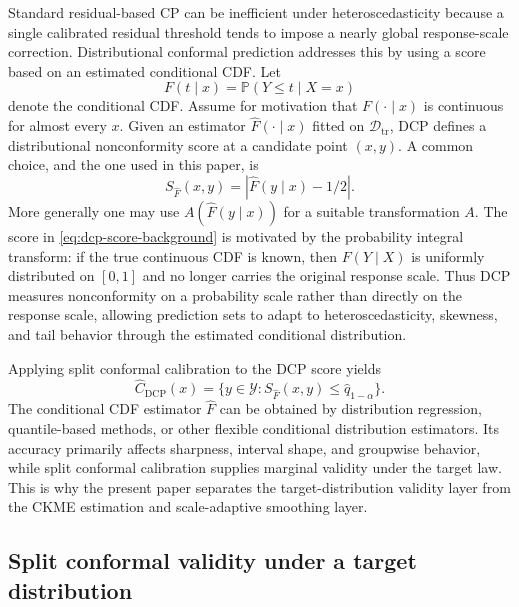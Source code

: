 \documentclass[11pt]{article}
\newcommand{\Ycal}{\mathcal Y}
\newcommand{\Dcal}{\mathcal D}
\newcommand{\Pp}{\mathbb P}
\newcommand{\abs}[1]{\left\lvert #1 \right\rvert}
\begin{document}
Standard residual-based CP can be inefficient under heteroscedasticity because a single calibrated residual threshold tends to impose a nearly global response-scale correction. Distributional conformal prediction addresses this by using a score based on an estimated conditional CDF. Let
\[
  F(t\mid x)=\Pp(Y\le t\mid X=x)
\]
denote the conditional CDF. Assume for motivation that \(F(\cdot\mid x)\) is continuous for almost every \(x\). Given an estimator \(\widehat F(\cdot\mid x)\) fitted on \(\Dcal_{\mathrm{tr}}\), DCP defines a distributional nonconformity score at a candidate point \((x,y)\). A common choice, and the one used in this paper, is
\begin{equation}
  S_{\widehat F}(x,y)=\abs{\widehat F(y\mid x)-1/2}.
  \label{eq:dcp-score-background}
\end{equation}
More generally one may use \(A(\widehat F(y\mid x))\) for a suitable transformation \(A\). The score in \eqref{eq:dcp-score-background} is motivated by the probability integral transform: if the true continuous CDF is known, then \(F(Y\mid X)\) is uniformly distributed on \([0,1]\) and no longer carries the original response scale. Thus DCP measures nonconformity on a probability scale rather than directly on the response scale, allowing prediction sets to adapt to heteroscedasticity, skewness, and tail behavior through the estimated conditional distribution.

Applying split conformal calibration to the DCP score yields
\[
  \widehat C_{\mathrm{DCP}}(x)
  =
  \{y\in\Ycal:S_{\widehat F}(x,y)\le \widehat q_{1-\alpha}\}.
\]
The conditional CDF estimator \(\widehat F\) can be obtained by distribution regression, quantile-based methods, or other flexible conditional distribution estimators. Its accuracy primarily affects sharpness, interval shape, and groupwise behavior, while split conformal calibration supplies marginal validity under the target law. This is why the present paper separates the target-distribution validity layer from the CKME estimation and scale-adaptive smoothing layer.

\subsection{Split conformal validity under a target distribution}
\end{document}
